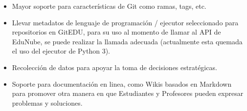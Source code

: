 \begin{itemize}
    \item Mayor soporte para características de Git como ramas, tags, etc.
    \item Llevar metadatos de lenguaje de programación / ejecutor seleccionado para repositorios en GitEDU, para su uso al momento de llamar al API de EduNube, se puede realizar la llamada adecuada (actualmente esta quemada el uso del ejecutor de Python 3).
    \item Recolección de datos para apoyar la toma de decisiones estratégicas.
    \item Soporte para documentación en linea, como Wikis basados en Markdown para promover otra manera en que Estudiantes y Profesores pueden expresar problemas y soluciones.
\end{itemize}

